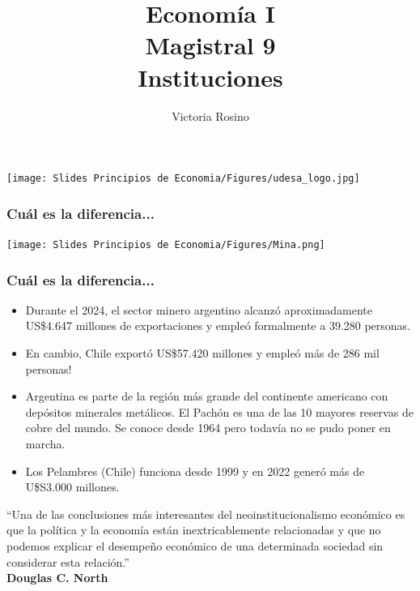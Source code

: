 \documentclass{beamer}
\title[Economía I]{Economía I \vspace{3mm}
\\ Magistral 9 \vspace{3mm} \\ Instituciones}
\date{}
\author[Victoria Rosino]{Victoria Rosino}
\institute[]{Universidad de San Andrés}
\begin{document}
\begin{frame}
\vspace{0.3cm}
\titlepage
\centering
\vspace{-0.9cm}
\texttt{[image: Slides Principios de Economia/Figures/udesa\_logo.jpg]} 
\end{frame}

\begin{frame}
\frametitle{Cuál es la diferencia...}
\centering
\texttt{[image: Slides Principios de Economia/Figures/Mina.png]}
\end{frame}

\begin{frame}
\frametitle{Cuál es la diferencia...}
\begin{itemize}
    \item Durante el 2024, el sector minero argentino alcanzó aproximadamente US\$4.647 millones de exportaciones y empleó formalmente a 39.280 personas.
    \item En cambio, Chile exportó US\$57.420 millones y empleó más de 286 mil personas!
    \item  Argentina es parte de la región más grande del continente americano con depósitos minerales metálicos. El Pachón es una de las 10 mayores reservas de cobre del mundo. Se conoce desde 1964 pero todavía no se pudo poner en marcha.
    \item Los Pelambres (Chile) funciona desde 1999 y en 2022 generó más de U\$S3.000 millones.
\end{itemize}
\end{frame}



\begin{frame}
\centering
\begin{boxB}
“Una de las conclusiones más interesantes del neoinstitucionalismo económico es que la política y la economía están inextricablemente relacionadas y que no podemos explicar el desempeño económico de una determinada sociedad sin considerar esta relación.” \\
\centering \textbf{Douglas C. North}
\end{boxB}
\end{frame}
\end{document}
